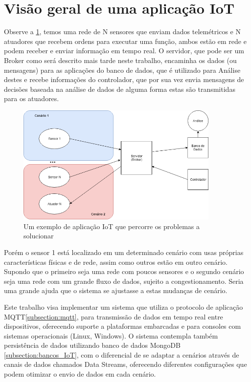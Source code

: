 \section{Visão geral de uma aplicação IoT}
\label{section:overview}

Observe  a \ref{fig:1.1.0/iot_app}, temos uma rede de N sensores que enviam dados telemétricos e N atuadores que recebem ordens para executar uma função, ambos estão em rede e podem receber e enviar informação em tempo real. O servidor, que pode ser um Broker como será descrito mais tarde neste trabalho, encaminha os dados (ou mensagens) para as aplicações do banco de dados, que é utilizado para Análise destes e recebe informações do controlador, que por sua vez envia mensagens de decisões baseada na análise de dados de alguma forma estas são transmitidas para os atuadores.

\begin{figure}[h!]
\centering
\includegraphics[width=10cm]{./02_Capitulos/02_Cap1/figures/iot_app}
\caption{Um exemplo de aplicação IoT que percorre os problemas a solucionar}
\label{fig:1.1.0/iot_app}
\end{figure}

Porém o sensor 1 está localizado em um determinado cenário com usas próprias características físicas e de rede, assim como outros estão em outro cenário. Supondo que o primeiro seja uma rede com poucos sensores e o segundo cenário seja uma rede com um grande fluxo de dados, sujeito a congestionamento. Seria uma grande ajuda que o  sistema se ajustasse a estas mudanças de cenário.

Este trabalho visa implementar um sistema que utiliza o protocolo de aplicação MQTT\ref{subsection:mqtt}, para transmissão de dados em tempo real entre dispositivos, oferecendo suporte a plataformas embarcadas e para consoles com sistemas operacionais (Linux, Windows). O sistema contempla também persistência de dados utilizando banco de dados MongoDB \ref{subsection:bancos_IoT}, com o diferencial de se adaptar a cenários através de canais de dados chamados Data Streams, oferecendo diferentes configurações que podem otimizar o envio de dados em cada cenário.


